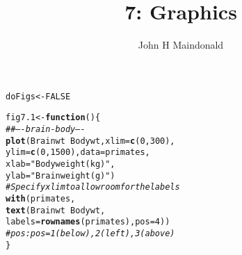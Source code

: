 \documentclass[12pt, a4paper,  BCOR=8.25mm, DIV=15]{scrartcl}\usepackage[]{graphicx}\usepackage[]{color}
\makeatletter
\newcommand{\hlnum}[1]{\textcolor[rgb]{0.686,0.059,0.569}{#1}}%
\newcommand{\hlstr}[1]{\textcolor[rgb]{0.192,0.494,0.8}{#1}}%
\newcommand{\hlcom}[1]{\textcolor[rgb]{0.678,0.584,0.686}{\textit{#1}}}%
\newcommand{\hlopt}[1]{\textcolor[rgb]{0,0,0}{#1}}%
\newcommand{\hlstd}[1]{\textcolor[rgb]{0.345,0.345,0.345}{#1}}%
\newcommand{\hlkwa}[1]{\textcolor[rgb]{0.161,0.373,0.58}{\textbf{#1}}}%
\newcommand{\hlkwb}[1]{\textcolor[rgb]{0.69,0.353,0.396}{#1}}%
\newcommand{\hlkwc}[1]{\textcolor[rgb]{0.333,0.667,0.333}{#1}}%
\newcommand{\hlkwd}[1]{\textcolor[rgb]{0.737,0.353,0.396}{\textbf{#1}}}%
\newenvironment{kframe}{%
 \def\at@end@of@kframe{}%
 \ifinner\ifhmode%
  \def\at@end@of@kframe{\end{minipage}}%
  \begin{minipage}{\columnwidth}%
 \fi\fi%
 \def\FrameCommand##1{\hskip\@totalleftmargin \hskip-\fboxsep
 \colorbox{shadecolor}{##1}\hskip-\fboxsep
     \hskip-\linewidth \hskip-\@totalleftmargin \hskip\columnwidth}%
 \MakeFramed {\advance\hsize-\width
   \@totalleftmargin\z@ \linewidth\hsize
   \@setminipage}}%
 {\par\unskip\endMakeFramed%
 \at@end@of@kframe}
\newenvironment{knitrout}{}{} %
\makeatother
\begin{document}



\title{7: Graphics}
\author{John H Maindonald}
\maketitle

\vspace*{-1cm}

\begin{knitrout}
\color{fgcolor}\begin{kframe}
\begin{alltt}
\hlstd{doFigs} \hlkwb{<-} \hlnum{FALSE}
\end{alltt}
\end{kframe}
\end{knitrout}

\begin{knitrout}
\color{fgcolor}\begin{kframe}
\begin{alltt}
\hlstd{fig7.1} \hlkwb{<-} \hlkwa{function}\hlstd{()\{}
\hlcom{## ---- brain-body ----}
\hlkwd{plot}\hlstd{(Brainwt} \hlopt{~} \hlstd{Bodywt,} \hlkwc{xlim}\hlstd{=}\hlkwd{c}\hlstd{(}\hlnum{0}\hlstd{,} \hlnum{300}\hlstd{),}
     \hlkwc{ylim}\hlstd{=}\hlkwd{c}\hlstd{(}\hlnum{0}\hlstd{,}\hlnum{1500}\hlstd{),} \hlkwc{data}\hlstd{=primates,}
     \hlkwc{xlab}\hlstd{=}\hlstr{"Body weight (kg)"}\hlstd{,}
     \hlkwc{ylab}\hlstd{=}\hlstr{"Brain weight (g)"}\hlstd{)}
\hlcom{# Specify xlim to allow room for the labels}
\hlkwd{with}\hlstd{(primates,}
     \hlkwd{text}\hlstd{(Brainwt} \hlopt{~} \hlstd{Bodywt,}
          \hlkwc{labels}\hlstd{=}\hlkwd{rownames}\hlstd{(primates),} \hlkwc{pos}\hlstd{=}\hlnum{4}\hlstd{))}
\hlcom{# pos: pos=1 (below), 2 (left), 3 (above)}
\hlstd{\}}
\end{alltt}
\end{kframe}
\end{knitrout}
\end{document}
